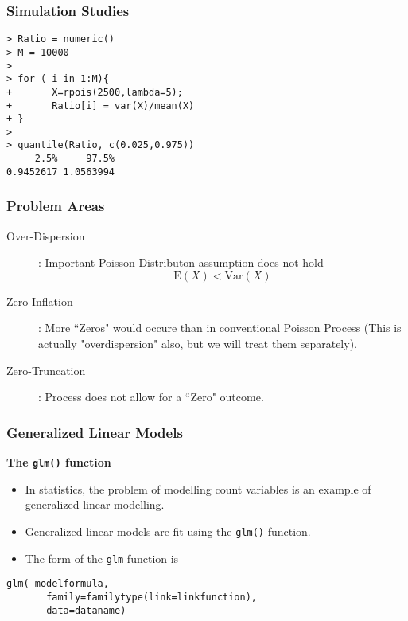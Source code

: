 \documentclass[MASTER.tex]{subfiles}
\begin{document}
\begin{frame}[fragile]
\frametitle{Simulation Studies}
\large
	\begin{framed}
		\begin{verbatim}
> Ratio = numeric()
> M = 10000
> 
> for ( i in 1:M){
+       X=rpois(2500,lambda=5);
+       Ratio[i] = var(X)/mean(X)
+ }
> 
> quantile(Ratio, c(0.025,0.975))
     2.5%     97.5% 
0.9452617 1.0563994 

		\end{verbatim}
	\end{framed}
\end{frame}

\begin{frame}
\frametitle{Problem Areas}
\Large
\begin{description}
\item[Over-Dispersion] : Important Poisson Distributon assumption does not hold 
\[ \mathrm{E}(X)  < \mathrm{Var}(X) \]
\item[Zero-Inflation] : More ``Zeros" would occure than in conventional Poisson Process (This is actually "overdispersion" also, but we will treat them separately). \smallskip
\item[ Zero-Truncation] : Process does not allow for a ``Zero" outcome. 
\end{description}
\end{frame}
\begin{frame}[fragile]
\frametitle{Generalized Linear Models}\large
\textbf{The \texttt{glm()} function}
\begin{itemize}
\item In statistics, the problem of modelling count variables is an example of generalized linear modelling.
\item Generalized linear models are fit using the \texttt{glm()} function. 
\item The form of the \texttt{glm} function is
\end{itemize}
{
\normalsize
\begin{framed}
 \begin{verbatim}
glm( modelformula, 
       family=familytype(link=linkfunction),
       data=dataname)
\end{verbatim}
\end{framed}
}
\end{frame}
\end{document}
